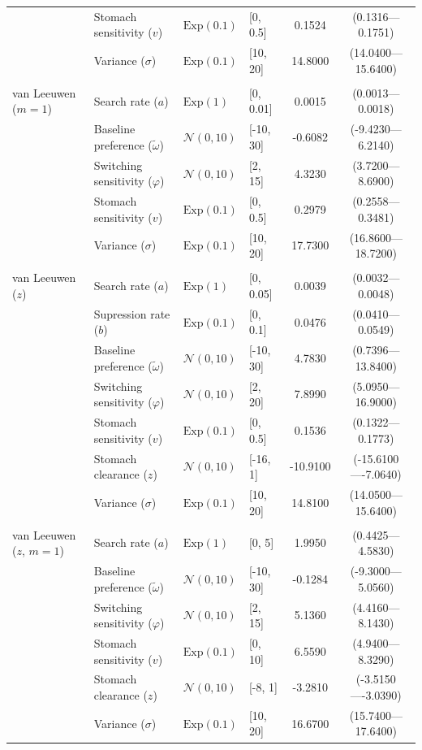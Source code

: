 \begin{longtable}{@{} llllcc @{}}
 & Stomach sensitivity ($v$) & $\text{Exp}(0.1)$ & [0, 0.5] & 0.1524 & (0.1316---0.1751) \\
 & Variance ($\sigma$) & $\text{Exp}(0.1)$ & [10, 20] & 14.8000 & (14.0400---15.6400) \\
\hline \\[-1.8ex]
van Leeuwen ($m=1$) & Search rate ($a$) & $\text{Exp}(1)$ & [0, 0.01] & 0.0015 & (0.0013---0.0018) \\
 & Baseline preference ($\tilde{\omega}$) & $\mathcal{N}(0, 10)$ & [-10, 30] & -0.6082 & (-9.4230---6.2140) \\
 & Switching sensitivity ($\varphi$) & $\mathcal{N}(0, 10)$ & [2, 15] & 4.3230 & (3.7200---8.6900) \\
 & Stomach sensitivity ($v$) & $\text{Exp}(0.1)$ & [0, 0.5] & 0.2979 & (0.2558---0.3481) \\
 & Variance ($\sigma$) & $\text{Exp}(0.1)$ & [10, 20] & 17.7300 & (16.8600---18.7200) \\
\hline \\[-1.8ex]
van Leeuwen ($z$) & Search rate ($a$) & $\text{Exp}(1)$ & [0, 0.05] & 0.0039 & (0.0032---0.0048) \\
 & Supression rate ($b$) & $\text{Exp}(0.1)$ & [0, 0.1] & 0.0476 & (0.0410---0.0549) \\
 & Baseline preference ($\tilde{\omega}$) & $\mathcal{N}(0, 10)$ & [-10, 30] & 4.7830 & (0.7396---13.8400) \\
 & Switching sensitivity ($\varphi$) & $\mathcal{N}(0, 10)$ & [2, 20] & 7.8990 & (5.0950---16.9000) \\
 & Stomach sensitivity ($v$) & $\text{Exp}(0.1)$ & [0, 0.5] & 0.1536 & (0.1322---0.1773) \\
 & Stomach clearance ($z$) & $\mathcal{N}(0, 10)$ & [-16, 1] & -10.9100 & (-15.6100----7.0640) \\
 & Variance ($\sigma$) & $\text{Exp}(0.1)$ & [10, 20] & 14.8100 & (14.0500---15.6400) \\
\hline \\[-1.8ex]
van Leeuwen ($z$, $m=1$) & Search rate ($a$) & $\text{Exp}(1)$ & [0, 5] & 1.9950 & (0.4425---4.5830) \\
 & Baseline preference ($\tilde{\omega}$) & $\mathcal{N}(0, 10)$ & [-10, 30] & -0.1284 & (-9.3000---5.0560) \\
 & Switching sensitivity ($\varphi$) & $\mathcal{N}(0, 10)$ & [2, 15] & 5.1360 & (4.4160---8.1430) \\
 & Stomach sensitivity ($v$) & $\text{Exp}(0.1)$ & [0, 10] & 6.5590 & (4.9400---8.3290) \\
 & Stomach clearance ($z$) & $\mathcal{N}(0, 10)$ & [-8, 1] & -3.2810 & (-3.5150----3.0390) \\
 & Variance ($\sigma$) & $\text{Exp}(0.1)$ & [10, 20] & 16.6700 & (15.7400---17.6400) \\
\end{longtable}
\endgroup
